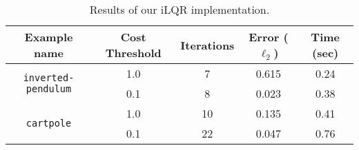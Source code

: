 \documentclass[nodate]{../cs-classes/cs-classes}
\begin{document}
\begin{table}[htbp]
    \centering
    \begin{tabular}{ccccc}
        \toprule
        Example name                                & Cost Threshold & Iterations & Error ($\ell_2$) & Time (sec) \\
        \midrule
        \multirow{2}{*}{\texttt{inverted-pendulum}} & 1.0            & 7          & 0.615            & 0.24       \\
                                                    & 0.1            & 8          & 0.023            & 0.38       \\\hline
        \multirow{2}{*}{\texttt{cartpole}}          & 1.0            & 10         & 0.135            & 0.41       \\
                                                    & 0.1            & 22         & 0.047            & 0.76       \\
        \bottomrule
    \end{tabular}
    \caption{Results of our iLQR implementation.}
    \label{table:perf}
\end{table}
\end{document}

